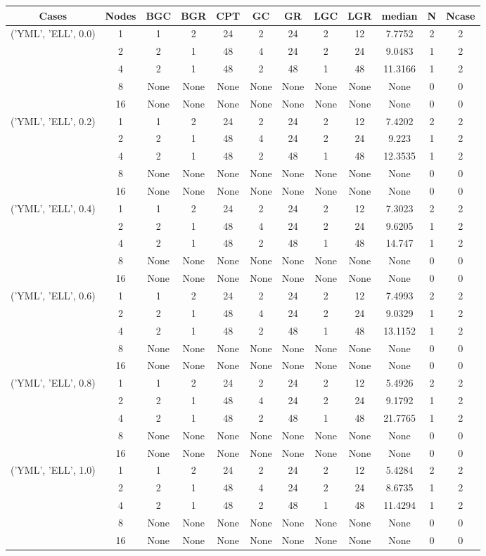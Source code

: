 \begin{tabular}{cccccccccccc}
\hline
Cases & Nodes& BGC& BGR& CPT& GC& GR& LGC& LGR& median & N & Ncase \\
\hline
\multirow{5}{*}{('YML', 'ELL', 0.0)}& 1& 1& 2& 24& 2& 24& 2& 12& 7.7752& 2& 2\\
& 2& 2& 1& 48& 4& 24& 2& 24& 9.0483& 1& 2\\
& 4& 2& 1& 48& 2& 48& 1& 48& 11.3166& 1& 2\\
& 8& None& None& None& None& None& None& None& None& 0& 0\\
& 16& None& None& None& None& None& None& None& None& 0& 0\\
\hline
\multirow{5}{*}{('YML', 'ELL', 0.2)}& 1& 1& 2& 24& 2& 24& 2& 12& 7.4202& 2& 2\\
& 2& 2& 1& 48& 4& 24& 2& 24& 9.223& 1& 2\\
& 4& 2& 1& 48& 2& 48& 1& 48& 12.3535& 1& 2\\
& 8& None& None& None& None& None& None& None& None& 0& 0\\
& 16& None& None& None& None& None& None& None& None& 0& 0\\
\hline
\multirow{5}{*}{('YML', 'ELL', 0.4)}& 1& 1& 2& 24& 2& 24& 2& 12& 7.3023& 2& 2\\
& 2& 2& 1& 48& 4& 24& 2& 24& 9.6205& 1& 2\\
& 4& 2& 1& 48& 2& 48& 1& 48& 14.747& 1& 2\\
& 8& None& None& None& None& None& None& None& None& 0& 0\\
& 16& None& None& None& None& None& None& None& None& 0& 0\\
\hline
\multirow{5}{*}{('YML', 'ELL', 0.6)}& 1& 1& 2& 24& 2& 24& 2& 12& 7.4993& 2& 2\\
& 2& 2& 1& 48& 4& 24& 2& 24& 9.0329& 1& 2\\
& 4& 2& 1& 48& 2& 48& 1& 48& 13.1152& 1& 2\\
& 8& None& None& None& None& None& None& None& None& 0& 0\\
& 16& None& None& None& None& None& None& None& None& 0& 0\\
\hline
\multirow{5}{*}{('YML', 'ELL', 0.8)}& 1& 1& 2& 24& 2& 24& 2& 12& 5.4926& 2& 2\\
& 2& 2& 1& 48& 4& 24& 2& 24& 9.1792& 1& 2\\
& 4& 2& 1& 48& 2& 48& 1& 48& 21.7765& 1& 2\\
& 8& None& None& None& None& None& None& None& None& 0& 0\\
& 16& None& None& None& None& None& None& None& None& 0& 0\\
\hline
\multirow{5}{*}{('YML', 'ELL', 1.0)}& 1& 1& 2& 24& 2& 24& 2& 12& 5.4284& 2& 2\\
& 2& 2& 1& 48& 4& 24& 2& 24& 8.6735& 1& 2\\
& 4& 2& 1& 48& 2& 48& 1& 48& 11.4294& 1& 2\\
& 8& None& None& None& None& None& None& None& None& 0& 0\\
& 16& None& None& None& None& None& None& None& None& 0& 0\\
\hline
\end{tabular}


